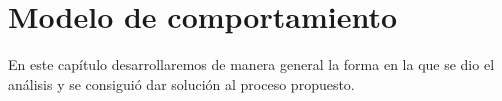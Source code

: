 
\pagebreak
\chapter{Modelo de comportamiento}

	En este capítulo desarrollaremos de manera general la forma en la que se dio el análisis y se consiguió dar solución al proceso propuesto.

	
	
	


